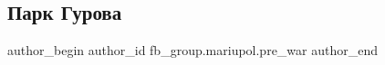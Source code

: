  
 
 
 
 

\subsection{Парк Гурова}
\label{sec:12_02_2023.fb.fb_group.mariupol.pre_war.1.park_gurova}

\ifcmt
 author_begin
   author_id fb_group.mariupol.pre_war
 author_end
\fi
